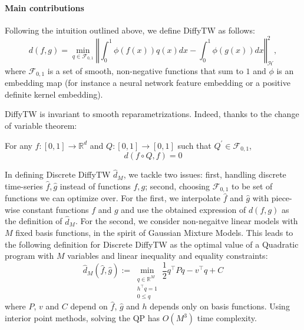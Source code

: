 \paragraph{Main contributions}Following the intuition outlined above, we define DiffyTW as follows:
\begin{equation*}
d(f, g) = \min_{q \in \mathcal F_{0,1}}\left\Vert \int_0^1 \phi(f(x))q(x)dx - \int_0^1\phi(g(x))dx\right\Vert^2_\mathcal H,
\end{equation*}
where $\mathcal F_{0,1}$ is a set of smooth, non-negative functions that sum to $1$ and $\phi$ is an embedding map (for instance a neural network feature embedding or a positive definite kernel embedding).

DiffyTW is invariant to smooth reparametrizations. Indeed, thanks to the change of variable theorem:
\begin{mdframed}
\begin{informaltheorem}
For any $f:[0,1] \to\mathbb R^d$ and $Q:[0,1]\to[0,1]$ such that $Q^\prime \in\mathcal F_{0,1}$,
\begin{equation*}
d(f\circ Q, f) = 0
\end{equation*}
\end{informaltheorem}
\end{mdframed}

In defining Discrete DiffyTW $\hat d_M$, we tackle two issues: first, handling discrete time-series $\hat f, \hat g$ instead of functions $f, g$; second, choosing $\mathcal F_{0,1}$ to be set of functions we can optimize over. For the first, we interpolate $\hat f$ and $\hat g$ with piece-wise constant functions $f$ and $g$ and use the obtained expression of $d(f, g)$ as the definition of $\hat d_M$. For the second, we consider non-negaitve linear models with $M$ fixed basis functions, in the spirit of Gaussian Mixture Models. This leads to the following definition for Discrete DiffyTW as the optimal value of a Quadratic program with $M$ variables and linear inequality and equality constraints:
\begin{equation*}
    \hat d_M(\hat f, \hat g) :=\min_{\substack{q\in\mathbb R^{M}\\h^\top q=1\\0 \leq q}}\frac{1}{2}q^\top Pq - v^\top q + C
\end{equation*}
where $P$, $v$ and $C$ depend on $\hat f$, $\hat g$ and $h$ depends only on basis functions. Using interior point methods, solving the QP has $O(M^3)$ time complexity.

